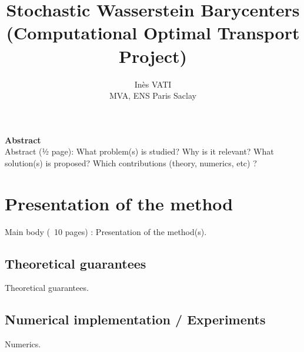 \documentclass[a4paper, 11pt]{article}
\title{Stochastic Wasserstein Barycenters (Computational Optimal Transport Project)}
\author{Inès VATI \email{ines.vati@eleves.enpc.fr} \\ MVA, ENS Paris Saclay }
\begin{document}
\maketitle

\begin{center}
    \textbf{Abstract} \\
     
Abstract (½ page): 
What problem(s) is studied? 
Why is it relevant? 
What solution(s) is proposed? 
Which contributions (theory, numerics, etc) ? 
\end{center}
\newpage



\section{Presentation of the method}
Main body (~10 pages) : 
Presentation of the method(s).  \cite{claici_stochastic_2018}
\subsection{Theoretical guarantees}
Theoretical guarantees. 
\subsection{Numerical implementation / Experiments }
Numerics. 




\printbibliography
\end{document}
